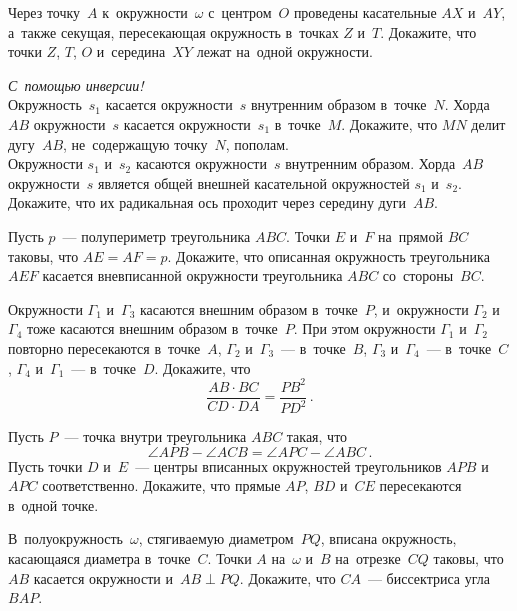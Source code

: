


\begin{problems}

\item
Через точку~$A$ к~окружности~$\omega$ с~центром~$O$ проведены
касательные $AX$ и~$AY$, а~также секущая, пересекающая окружность
в~точках $Z$ и~$T$.
Докажите, что точки $Z$, $T$, $O$ и~середина~$XY$ лежат на~одной окружности.

\item\emph{С~помощью инверсии!}\\
\subproblem
Окружность~$s_{1}$ касается окружности~$s$ внутренним образом в~точке~$N$.
Хорда~$AB$ окружности~$s$ касается окружности~$s_{1}$ в~точке~$M$.
Докажите, что $MN$ делит дугу~$AB$, не~содержащую точку~$N$, пополам.
\\
\subproblem
Окружности $s_{1}$ и~$s_{2}$ касаются окружности~$s$ внутренним образом.
Хорда~$AB$ окружности~$s$ является общей внешней касательной
окружностей $s_{1}$ и~$s_{2}$.
Докажите, что их радикальная ось проходит через середину дуги~$AB$.

\item
Пусть $p$~--- полупериметр треугольника $ABC$.
Точки $E$ и~$F$ на~прямой $BC$ таковы, что $AE = AF = p$.
Докажите, что описанная окружность треугольника $AEF$ касается вневписанной
окружности треугольника $ABC$ со~стороны~$BC$.

\item
Окружности $\Gamma_{1}$ и~$\Gamma_{3}$ касаются внешним образом в~точке~$P$,
и~окружности $\Gamma_{2}$ и~$\Gamma_{4}$ тоже касаются внешним образом
в~точке~$P$.
При этом окружности
$\Gamma_{1}$ и~$\Gamma_{2}$ повторно пересекаются в~точке~$A$,
$\Gamma_{2}$ и~$\Gamma_{3}$~--- в~точке~$B$,
$\Gamma_{3}$ и~$\Gamma_{4}$~--- в~точке~$C$,
$\Gamma_{4}$ и~$\Gamma_{1}$~--- в~точке~$D$.
Докажите, что
\[
    \frac{AB \cdot BC}{CD \cdot DA} = \frac{PB^2}{PD^2}
\, . \]

\item
Пусть $P$~--- точка внутри треугольника $ABC$ такая, что
\[
    \angle APB - \angle ACB = \angle APC - \angle ABC
\, . \]
Пусть точки $D$ и~$E$~--- центры вписанных окружностей
треугольников $APB$ и~$APC$ соответственно.
Докажите, что прямые $AP$, $BD$ и~$CE$ пересекаются в~одной точке.

\item
В~полуокружность~$\omega$, стягиваемую диаметром~$PQ$, вписана окружность,
касающаяся диаметра в~точке~$C$.
Точки $A$ на~$\omega$ и~$B$ на~отрезке~$CQ$ таковы, что $AB$ касается
окружности и~$AB \perp PQ$.
Докажите, что $CA$~--- биссектриса угла $BAP$.


\end{problems}
